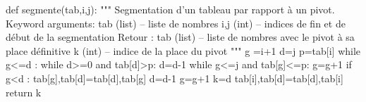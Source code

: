 \documentclass[10pt,fleqn]{article} %
\newcommand{\tsf}[1]{\small{\texttt{#1}}}
\begin{document}
\begin{py}
\begin{python}
def segmente(tab,i,j):
    """
    Segmentation d'un tableau par rapport à un pivot.
    Keyword arguments: 
      tab (list) -- liste de nombres
      i,j (int) -- indices de fin et de début de la segmentation
    Retour :    
      tab (list) -- liste de nombres avec le pivot à sa place définitive
      k (int) -- indice de la place du pivot
    """
    g =i+1
    d=j
    p=tab[i]
    while g<=d :
        while d>=0 and tab[d]>p:
            d=d-1
        while g<=j and tab[g]<=p:
            g=g+1
        if g<d :
            tab[g],tab[d]=tab[d],tab[g]
            d=d-1
            g=g+1
    k=d
    tab[i],tab[d]=tab[d],tab[i]
    return k
\end{python}
\end{py}
\end{document}

